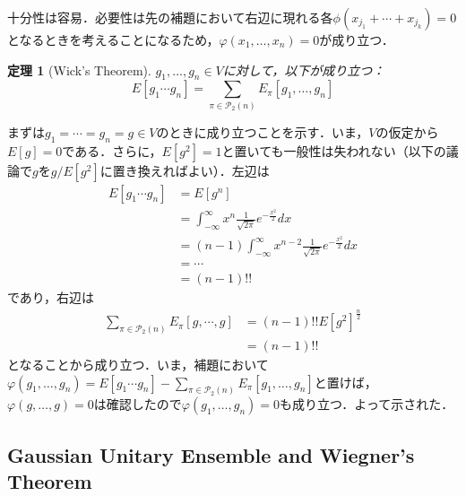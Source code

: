 \documentclass{ltjsarticle}
\makeatletter
\theoremstyle{mystyle1}
\newtheorem{thm}[dfn]{定理}
\theoremstyle{mystyle2}
\theoremstyle{mystyle3}
\renewenvironment{proof}[1][\proofname]{\par
  \pushQED{\qed}%
  \normalfont
  \topsep6\p@\@plus6\p@ \trivlist
  \item[\hskip\labelsep{\bfseries\sffamily #1}]\ignorespaces
}{%
  \popQED\endtrivlist\@endpefalse
}
\renewcommand\proofname{証明}
\makeatother
\begin{document}
\begin{proof}
    十分性は容易．必要性は先の補題において右辺に現れる各$\phi(x_{j_1}+\cdots+x_{j_k})=0$となるときを考えることになるため，$\varphi(x_1,\ldots,x_n)=0$が成り立つ．
\end{proof}

\begin{thm}[Wick's Theorem]
    $g_1,\ldots,g_n\in V$に対して，以下が成り立つ：
    \begin{equation}
        E[g_1\cdots g_n]=\sum_{\pi\in\mathcal{P}_2(n)}E_\pi[g_1,\ldots,g_n]
    \end{equation}
\end{thm}

\begin{proof}
    まずは$g_1=\cdots=g_n=g\in V$のときに成り立つことを示す．いま，$V$の仮定から$E[g]=0$である．さらに，$E[g^2]=1$と置いても一般性は失われない（以下の議論で$g$を$g/E[g^2]$に置き換えればよい）．左辺は
    \begin{equation}
        \begin{split}
            E[g_1\cdots g_n]
            & =E[g^n]                                                                      \\
            & =\int_{-\infty}^\infty x^n\frac{1}{\sqrt{2\pi}}e^{-\frac{x^2}{2}}dx          \\
            & =(n-1)\int_{-\infty}^\infty x^{n-2}\frac{1}{\sqrt{2\pi}}e^{-\frac{x^2}{2}}dx \\
            & =\cdots                                                                      \\
            & =(n-1)!!
        \end{split}
    \end{equation}
    であり，右辺は
    \begin{equation}
        \begin{split}
            \sum_{\pi\in\mathcal{P}_2(n)}E_\pi[g,\cdots,g]
            & =(n-1)!!E[g^2]^{\frac{n}{2}} \\
            & =(n-1)!!
        \end{split}
    \end{equation}
    となることから成り立つ．いま，補題において$\varphi(g_1,\ldots,g_n)=E[g_1\cdots g_n]-\sum_{\pi\in\mathcal{P}_2(n)}E_\pi[g_1,\ldots,g_n]$と置けば，$\varphi(g,\ldots,g)=0$は確認したので$\varphi(g_1,\ldots,g_n)=0$も成り立つ．よって示された．
\end{proof}

\subsection{Gaussian Unitary Ensemble and Wiegner's Theorem}
\end{document}
